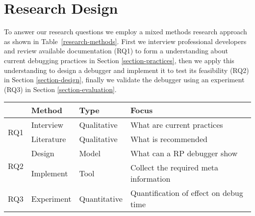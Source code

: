 \section{Research Design}
To answer our research questions we employ a mixed methods research approach as shown in Table~\ref{research-methods}.
First we interview professional developers and review available documentation (RQ1) to form a understanding about current debugging practices in Section \ref{section-practices},
then we apply this understanding to design a debugger and implement it to test its feasibility (RQ2) in Section \ref{section-design},
finally we validate the debugger using an experiment (RQ3) in Section \ref{section-evaluation}.

\begin{table*}[b]
\centering
\caption{Research Methods used in the study}
\label{research-methods}
\begin{tabular}{llll}
\hline
\textbf{}            & \textbf{Method} & \textbf{Type} & \textbf{Focus}                               \\ \hline
\multirow{2}{*}{RQ1} & Interview       & Qualitative   & What are current practices                   \\ \cline{2-4} 
                     & Literature      & Qualitative   & What is recommended                          \\ \hline
\multirow{2}{*}{RQ2} & Design          & Model         & What can a RP debugger show                  \\ \cline{2-4} 
                     & Implement       & Tool          & Collect the required meta information        \\ \hline
RQ3                  & Experiment      & Quantitative  & Quantification of effect on debug time       \\ \hline
\end{tabular}
\end{table*}

\iffalse
\todo{
qualitive data
quantitive
design, implemented, tested with real developers
buzz words: mixed methods, grounded theory
}
\fi